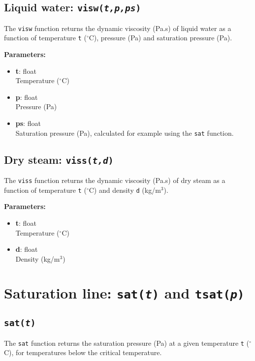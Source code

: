 \subsection{Liquid water: \texttt{visw(\emph{t,p,ps})}}
\label{sec:t2thermo:visw}

The \texttt{visw} function returns the dynamic viscosity (Pa.s) of liquid water as a function of temperature \texttt{t} ($^{\circ}$C), pressure (Pa) and saturation pressure (Pa).

\textbf{Parameters:}
\begin{itemize}
\item \textbf{t}: float\\
  Temperature ($^{\circ}$C)
\item \textbf{p}: float\\
  Pressure (Pa)
\item \textbf{ps}: float\\
  Saturation pressure (Pa), calculated for example using the \texttt{sat} function.
\end{itemize}

\subsection{Dry steam: \texttt{viss(\emph{t,d})}}
\label{sec:t2thermo:viss}

The \texttt{viss} function returns the dynamic viscosity (Pa.s) of dry steam as a function of temperature \texttt{t} ($^{\circ}$C) and density \texttt{d} (kg/m$^3$).

\textbf{Parameters:}
\begin{itemize}
\item \textbf{t}: float\\
  Temperature ($^{\circ}$C)
\item \textbf{d}: float\\
  Density (kg/m$^3$)
\end{itemize}

\section{Saturation line: \texttt{sat(\emph{t})} and \texttt{tsat(\emph{p})}}

\subsection{\texttt{sat(\emph{t})}}
\label{sec:t2thermo:sat}

The \texttt{sat} function returns the saturation pressure (Pa) at a given temperature \texttt{t} ($^{\circ}$C), for temperatures below the critical temperature.

